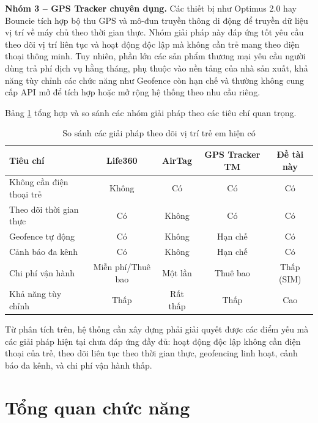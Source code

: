 \documentclass[../DoAn.tex]{subfiles}
\begin{document}
\textbf{Nhóm 3 – GPS Tracker chuyên dụng.} Các thiết bị như Optimus 2.0 hay Bouncie tích hợp bộ thu GPS và mô-đun truyền thông di động để truyền dữ liệu vị trí về máy chủ theo thời gian thực. Nhóm giải pháp này đáp ứng tốt yêu cầu theo dõi vị trí liên tục và hoạt động độc lập mà không cần trẻ mang theo điện thoại thông minh. Tuy nhiên, phần lớn các sản phẩm thương mại yêu cầu người dùng trả phí dịch vụ hằng tháng, phụ thuộc vào nền tảng của nhà sản xuất, khả năng tùy chỉnh các chức năng như Geofence còn hạn chế và thường không cung cấp API mở để tích hợp hoặc mở rộng hệ thống theo nhu cầu riêng.

Bảng \ref{table:comparison} tổng hợp và so sánh các nhóm giải pháp theo các tiêu chí quan trọng.

\begin{table}[H]
\centering
\caption{So sánh các giải pháp theo dõi vị trí trẻ em hiện có}
\label{table:comparison}
\begin{tabular}{|l|c|c|c|c|}
\hline
\textbf{Tiêu chí} & \textbf{Life360} & \textbf{AirTag} & \textbf{GPS Tracker TM} & \textbf{Đề tài này} \\
\hline
Không cần điện thoại trẻ    & Không & Có       & Có        & Có      \\
\hline
Theo dõi thời gian thực     & Có    & Không    & Có        & Có      \\
\hline
Geofence tự động            & Có    & Không    & Hạn chế   & Có      \\
\hline
Cảnh báo đa kênh            & Có    & Không    & Hạn chế   & Có      \\
\hline
Chi phí vận hành            & Miễn phí/Thuê bao & Một lần & Thuê bao & Thấp (SIM) \\
\hline
Khả năng tùy chỉnh          & Thấp  & Rất thấp & Thấp      & Cao     \\
\hline
\end{tabular}
\end{table}

Từ phân tích trên, hệ thống cần xây dựng phải giải quyết được các điểm yếu mà các giải pháp hiện tại chưa đáp ứng đầy đủ: hoạt động độc lập không cần điện thoại của trẻ, theo dõi liên tục theo thời gian thực, geofencing linh hoạt, cảnh báo đa kênh, và chi phí vận hành thấp.

\section{Tổng quan chức năng}
\label{section:2.2}
\end{document}
